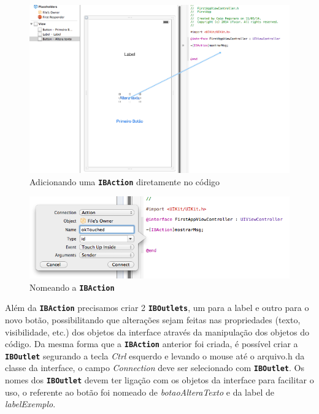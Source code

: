 \documentclass[a4paper,12pt,brazil,doubleside]{book}
\begin{document}
\begin{singlespace}
\begin{figure}[H]
  \centering
  \includegraphics[width=.99\textwidth]{figuras/3/tela_novo_projeto_27.png}
  \caption{Adicionando uma \texttt{\textbf{IBAction}} diretamente no código}
  \label{fig:a}
\end{figure}

\begin{figure}[H]
  \centering
  \includegraphics[width=.75\textwidth]{figuras/3/tela_novo_projeto_28.png}
  \caption{Nomeando a \texttt{\textbf{IBAction}}}
  \label{fig:a}
\end{figure}


Além da \texttt{\textbf{IBAction}} precisamos criar 2 \texttt{\textbf{IBOutlets}}, um para a label e outro para o novo botão, possibilitando que alterações sejam feitas nas propriedades (texto, visibilidade, etc.) dos objetos da interface através da manipulação dos objetos do código.
Da mesma forma que a \texttt{\textbf{IBAction}} anterior foi criada, é possível criar a \texttt{\textbf{IBOutlet}} segurando a tecla \emph{Ctrl} esquerdo e levando o mouse até o arquivo.h da classe da interface, o campo \emph{Connection} deve ser selecionado com \texttt{\textbf{IBOutlet}}.
Os nomes dos  \texttt{\textbf{IBOutlet}} devem ter ligação com os objetos da interface para facilitar o uso, o referente ao botão foi nomeado de \emph{botaoAlteraTexto} e da label de \emph{labelExemplo}.


\end{singlespace}
\end{document}
